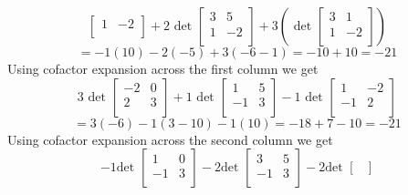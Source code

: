 \documentclass{report}
\begin{document}
{\[\begin{bmatrix}
                1 & -2\\
                \end{bmatrix} +2 \text{ det } \begin{bmatrix}
                3 & 5\\
                1 & -2\\
                \end{bmatrix} +3\left( \text{ det } \begin{bmatrix}
                3 & 1\\
                1 & -2\\
                \end{bmatrix} \right)
        \]
        \[
                = -1\left(  10\right) -2\left( -5 \right) +3\left( -6 -1 \right) = -10+10= -21
        \]
        Using cofactor expansion across the first column we get
        \[
                3 \text{ det } \begin{bmatrix}
                -2 & 0\\
                2 & 3\\
                \end{bmatrix} +1 \text{ det } \begin{bmatrix}
                1 & 5\\
                -1 & 3\\
                \end{bmatrix} -1 \text{ det } \begin{bmatrix}
                1 & -2\\
                -1 & 2\\
                \end{bmatrix}
        \]
            \[
                = 3\left( -6 \right) -1\left( 3 -10 \right) -1\left( 10 \right) = -18 +7 -10 = -21
            \]
        Using cofactor expansion across the second column we get
                 \[
                         -1 \text{det } \begin{bmatrix}
                         1 & 0\\
                         -1 & 3\\
                         \end{bmatrix} -2 \text{det } \begin{bmatrix}
                         3 & 5\\
                         -1 & 3\\
                         \end{bmatrix} -2 \text{det } \begin{bmatrix}

\end{bmatrix}\]}
\end{document}
